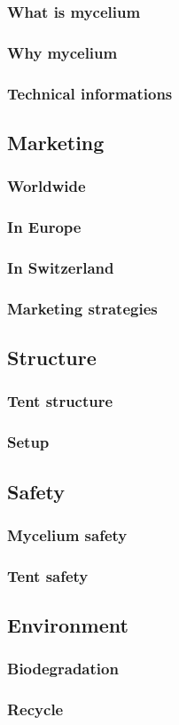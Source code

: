 \documentclass{article}
\begin{document}
\subsubsection{What is mycelium}
\subsubsection{Why mycelium}
\subsubsection{Technical informations}

\subsection{Marketing}
\subsubsection{Worldwide}
\subsubsection{In Europe}
\subsubsection{In Switzerland}
\subsubsection{Marketing strategies}

\subsection{Structure}
\subsubsection{Tent structure}
\subsubsection{Setup}

\subsection{Safety}
\subsubsection{Mycelium safety}
\subsubsection{Tent safety}

\subsection{Environment}
\subsubsection{Biodegradation}
\subsubsection{Recycle}
\end{document}
